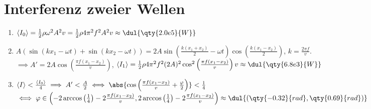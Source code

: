 \documentclass{article}
\begin{document}

\section{Interferenz zweier Wellen}
\begin{enumerate}[label=\alph*)]
    \item $\langle I_0 \rangle = \frac12 \rho \omega^2 A^2 v
    = \frac12 \rho 4 \pi^2 f^2 A^2 v
    \approx \dul{\qty{2.0e5}{W}}$

    \item $A (\sin(kx_1 - \omega t) + \sin(kx_2 - \omega t)) = 2A \sin\left(\frac{k(x_1 + x_2)}{2} - \omega t\right) \cos\left(\frac{k(x_1 - x_2)}{2}\right)$, $k = \frac{2 \pi f}{v}$. \\
    $\implies A' = 2A \cos\left(\frac{\pi f (x_1 - x_2)}{v}\right)$, 
    $\langle I_1 \rangle = \frac12 \rho 4 \pi^2 f^2 (2A)^2 \cos^2\left(\frac{\pi f (x_1 - x_2)}{v}\right) v
    \approx \dul{\qty{6.8e3}{W}}$

    \item $\langle I \rangle < \frac{\langle I_0 \rangle}{4} \implies A' < \frac{A}{2} 
    \iff \abs{\cos\left(\frac{\pi f (x_1 - x_2)}{v} + \frac{\varphi}{2} \right)} < \frac{1}{4}$ \\
    $\iff \varphi \in \left(- 2\arccos \left(\frac14\right) - 2\frac{\pi f (x_1 - x_2)}{v}, 2 \arccos \left(\frac14\right) - 2 \frac{\pi f (x_1 - x_2)}{v}\right) \approx \dul{(\qty{-0.32}{rad}, \qty{0.69}{rad})}$

\end{enumerate}
\end{document}
